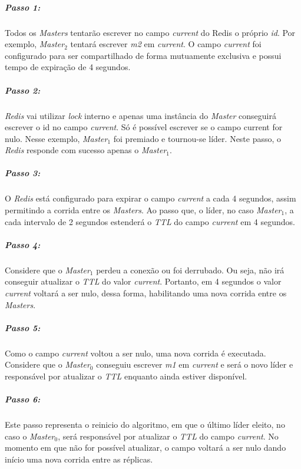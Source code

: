 \subparagraph{Passo 1:} Todos os \textit{Masters} tentarão escrever no campo \textit{current} do Redis o próprio \textit{id}. Por exemplo, \textit{Master$_2$} tentará escrever \textit{m2} em \textit{current}. O campo \textit{current} foi configurado para ser compartilhado de forma mutuamente exclusiva e possui tempo de expiração de 4 segundos.

\subparagraph{Passo 2:} \textit{Redis} vai utilizar \textit{lock} interno e apenas uma instância do \textit{Master} conseguirá escrever o id no campo \textit{current}. Só é possível escrever se o campo current for nulo. Nesse exemplo, \textit{Master$_1$} foi premiado e tournou-se líder. Neste passo, o \textit{Redis} responde com sucesso apenas o \textit{Master$_1$}.

\subparagraph{Passo 3:} O \textit{Redis} está configurado para expirar o campo \textit{current} a cada 4 segundos, assim permitindo a corrida entre os \textit{Masters}.
Ao passo que, o líder, no caso \textit{Master$_1$}, a cada intervalo de 2 segundos estenderá o \textit{TTL} do campo \textit{current} em 4 segundos.

\subparagraph{Passo 4:} Considere que o \textit{Master$_1$} perdeu a conexão ou foi derrubado. Ou seja, não irá conseguir atualizar o \textit{TTL} do valor \textit{current}. Portanto, em 4 segundos o valor \textit{current} voltará a ser nulo, dessa forma, habilitando uma nova corrida entre os \textit{Masters}.

\subparagraph{Passo 5:} Como o campo \textit{current} voltou a ser nulo, uma nova corrida é executada. Considere que o \textit{Master$_0$} conseguiu escrever \textit{m1} em \textit{current} e será o novo líder e responsável por atualizar o \textit{TTL} enquanto ainda estiver disponível.

\subparagraph{Passo 6:} Este passo representa o reinicio do algoritmo, em que o último líder eleito, no caso o \textit{Master$_0$}, será responsável por atualizar o \textit{TTL} do campo \textit{current}. No momento em que não for possível atualizar, o campo voltará a ser nulo dando início uma nova corrida entre as réplicas.


